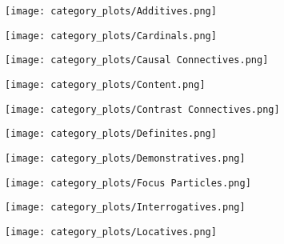 \documentclass{article}
\theoremstyle{plain}
\theoremstyle{definition}
\theoremstyle{remark}
\numberwithin{equation}{section}
\begin{document}
\begin{figure}
\begin{subfigure}[b]{0.3\textwidth}
    \centering
    \texttt{[image: category\_plots/Additives.png]}
    \caption{}\label{fig:add}
\end{subfigure}
\hfill
\begin{subfigure}[b]{0.3\textwidth}
    \centering
    \texttt{[image: category\_plots/Cardinals.png]}
    \caption{}\label{fig:card}
\end{subfigure}
\hfill
\begin{subfigure}[b]{0.3\textwidth}
    \centering
    \texttt{[image: category\_plots/Causal Connectives.png]}
    \caption{}\label{fig:causal}
\end{subfigure}
\hfill
\begin{subfigure}[b]{0.3\textwidth}
    \centering
    \texttt{[image: category\_plots/Content.png]}
    \caption{}\label{fig:con}
\end{subfigure}
\hfill
\begin{subfigure}[b]{0.3\textwidth}
    \centering
    \texttt{[image: category\_plots/Contrast Connectives.png]}
    \caption{}\label{fig:connect}
\end{subfigure}
\hfill
\begin{subfigure}[b]{0.3\textwidth}
    \centering
    \texttt{[image: category\_plots/Definites.png]}
    \caption{}\label{fig:def}
\end{subfigure}
\hfill
\begin{subfigure}[b]{0.3\textwidth}
    \centering
    \texttt{[image: category\_plots/Demonstratives.png]}
    \caption{}\label{fig:demon}
\end{subfigure}
\hfill
\begin{subfigure}[b]{0.3\textwidth}
    \centering
    \texttt{[image: category\_plots/Focus Particles.png]}
    \caption{}\label{fig:focus}
\end{subfigure}
\hfill
\begin{subfigure}[b]{0.3\textwidth}
    \centering
    \texttt{[image: category\_plots/Interrogatives.png]}
    \caption{}\label{fig:int}
\end{subfigure}
\hfill
\begin{subfigure}[b]{0.3\textwidth}
    \centering
    \texttt{[image: category\_plots/Locatives.png]}
    \caption{}\label{fig:loc}
\end{subfigure}

\end{figure}
\end{document}
